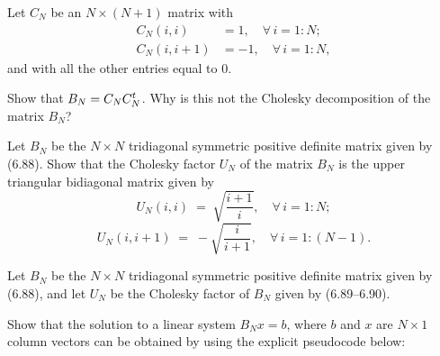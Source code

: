\begin{exercises}
Let $C_N$ be an $N \times (N+1)$ matrix with
\begin{align*}
C_N(i,i) &= 1, \quad \forall\, i = 1:N; \\
C_N(i,i+1) &= -1, \quad \forall\, i = 1:N,
\end{align*}
and with all the other entries equal to 0.

Show that $B_N = C_N C_N^{t}$. Why is this not the Cholesky decomposition of the matrix
$B_N$?

\item Let $B_N$ be the $N \times N$ tridiagonal symmetric positive definite matrix
given by (6.88). Show that the Cholesky factor $U_N$ of the matrix $B_N$ is the upper
triangular bidiagonal matrix given by
\begin{equation}
U_N(i,i) \;=\; \sqrt{\frac{i+1}{i}}, \quad \forall\, i = 1:N;
\end{equation}
\begin{equation}
U_N(i,i+1) \;=\; -\sqrt{\frac{i}{i+1}}, \quad \forall\, i = 1:(N-1).
\end{equation}

\item Let $B_N$ be the $N \times N$ tridiagonal symmetric positive definite matrix
given by (6.88), and let $U_N$ be the Cholesky factor of $B_N$ given by (6.89--6.90).

\begin{subparts}
\item Show that the solution to a linear system $B_N x = b$, where $b$ and $x$ are
$N \times 1$ column vectors can be obtained by using the explicit pseudocode below:

\begin{center}
\end{center}


\end{subparts}
\end{exercises}
